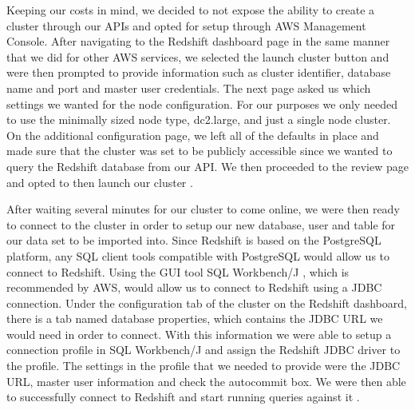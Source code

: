 Keeping our costs in mind, we decided to not expose the ability to create a cluster through our APIs and opted for setup through AWS Management Console. After navigating to the Redshift dashboard page in the same manner that we did for other AWS services, we selected the launch cluster button and were then prompted to provide information such as cluster identifier, database name and port and master user credentials. The next page asked us which settings we wanted for the node configuration. For our purposes we only needed to use the minimally sized node type, dc2.large, and just a single node cluster. On the additional configuration page, we left all of the defaults in place and made sure that the cluster was set to be publicly accessible since we wanted to query the Redshift database from our API. We then proceeded to the review page and opted to then launch our cluster \cite{hid-sp18-521-redshift-gettingstarted}.  

After waiting several minutes for our cluster to come online, we were then ready to connect to the cluster in order to setup our new database, user and table for our data set to be imported into. Since Redshift is based on the PostgreSQL platform, any SQL client tools compatible with PostgreSQL would allow us to connect to Redshift. Using the GUI tool SQL Workbench/J \cite{hid-sp18-521-sqlworkbenchj}, which is recommended by AWS, would allow us to connect to Redshift using a JDBC connection. Under the configuration tab of the cluster on the Redshift dashboard, there is a tab named database properties, which contains the JDBC URL we would need in order to connect. With this information we were able to setup a connection profile in SQL Workbench/J and assign the Redshift JDBC driver to the profile. The settings in the profile that we needed to provide were the JDBC URL, master user information and check the autocommit box. We were then able to successfully connect to Redshift and start running queries against it \cite{hid-sp18-521-redshift-gettingstarted}.  

